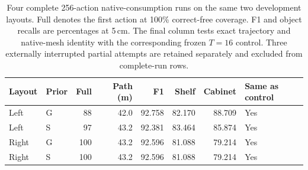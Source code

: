 \begin{table}[!htbp]
\centering\small
\caption{Four complete 256-action native-consumption runs on the same two development layouts. Full denotes the first action at 100\% correct-free coverage. F1 and object recalls are percentages at 5\,cm. The final column tests exact trajectory and native-mesh identity with the corresponding frozen $T=16$ control. Three externally interrupted partial attempts are retained separately and excluded from complete-run rows.}
\label{tab:native-consumption-policy}
\begin{tabular}{llrrrrrl}
\toprule
Layout & Prior & Full & Path (m) & F1 & Shelf & Cabinet & Same as control \\
\midrule
Left & G & 88 & 42.0 & 92.758 & 82.170 & 88.709 & Yes \\
Left & S & 97 & 43.2 & 92.381 & 83.464 & 85.874 & Yes \\
Right & G & 100 & 43.2 & 92.596 & 81.088 & 79.214 & Yes \\
Right & S & 100 & 43.2 & 92.596 & 81.088 & 79.214 & Yes \\
\bottomrule
\end{tabular}
\end{table}
